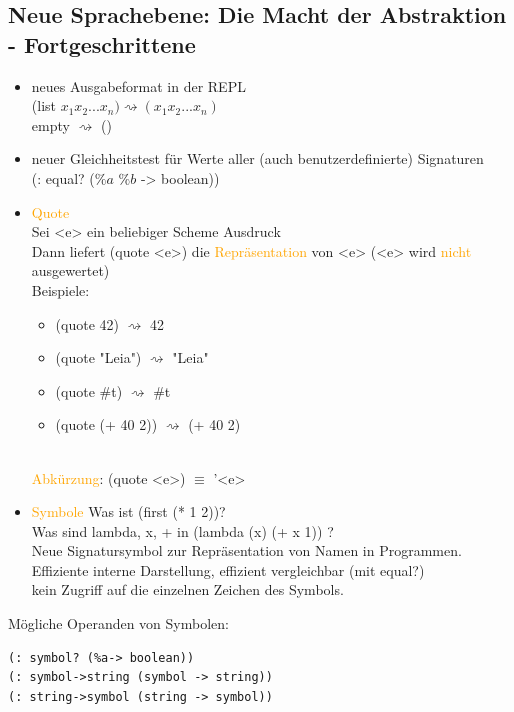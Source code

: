 \documentclass[paper=a4, fontsize=11pt]{scrartcl}
\numberwithin{equation}{section}
\numberwithin{figure}{section}
\numberwithin{table}{section}
\begin{document}
\begin{lstlistig}
\section{Neue Sprachebene: Die Macht der Abstraktion - Fortgeschrittene}
\begin{itemize}
\item neues Ausgabeformat in der REPL \\
(list $x_{1} x_{2} ... x_{n}) \rightsquigarrow (x_{1} x_{2} ... x_{n})$ \\
empty $\rightsquigarrow$ ()
\item neuer Gleichheitstest für Werte aller (auch benutzerdefinierte) Signaturen \\
(: equal? ($\%a$ $\%b$ -> boolean))
\item \textcolor{orange}{Quote} \\
Sei <e> ein beliebiger Scheme Ausdruck \\
Dann liefert (quote <e>) die \textcolor{orange}{Repräsentation} von <e> (<e> wird \textcolor{orange}{nicht} ausgewertet) \\
Beispiele: \begin{itemize}
\item (quote 42) $\rightsquigarrow$ 42
\item (quote "Leia") $\rightsquigarrow$ "Leia"
\item (quote #t) $\rightsquigarrow$ #t
\item (quote (+ 40 2)) $\rightsquigarrow$ (+ 40 2)
\end{itemize} \\
\textcolor{orange}{Abkürzung}: (quote <e>) $\equiv$ '<e>
\item \textcolor{orange}{Symbole}
Was ist (first (* 1 2))? \\
Was sind lambda, x, + in (lambda (x) (+ x 1)) ? \\
Neue Signatursymbol zur Repräsentation von Namen in Programmen. Effiziente interne Darstellung, effizient vergleichbar (mit equal?) \\
kein Zugriff auf die einzelnen Zeichen des Symbols.
\end{itemize}
Mögliche Operanden von Symbolen:
\begin{lstlisting}
(: symbol? (%a-> boolean))
(: symbol->string (symbol -> string))
(: string->symbol (string -> symbol))
\end{lstlisting}

\end{lstlistig}
\end{document}
